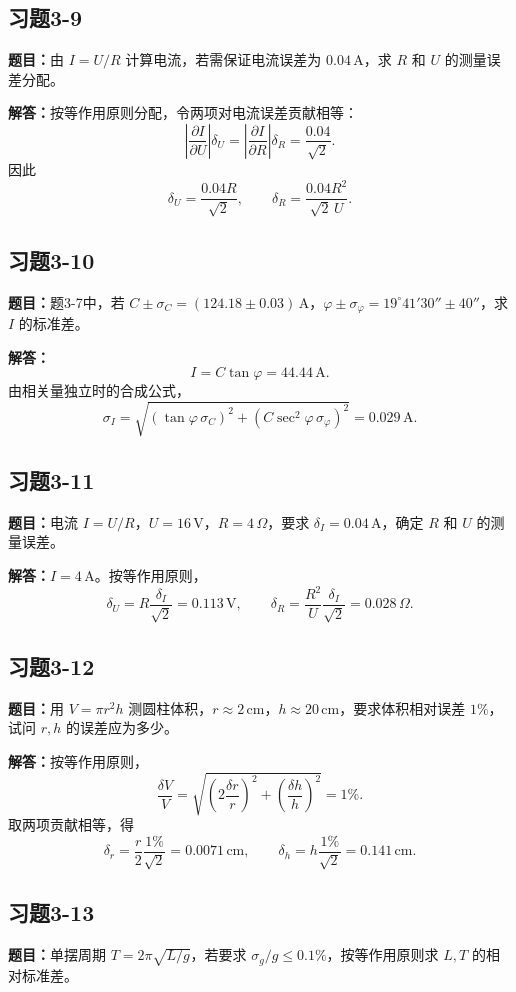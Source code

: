 \documentclass[UTF8,zihao=-4]{ctexart}
\newcommand{\problem}[1]{\subsection*{#1}}
\newcommand{\timu}{\noindent\textbf{题目：}}
\newcommand{\jieda}{\noindent\textbf{解答：}}
\begin{document}
{\problem{习题3-9}
\timu 由 $I=U/R$ 计算电流，若需保证电流误差为 $0.04\,\mathrm{A}$，求 $R$ 和 $U$ 的测量误差分配。

\jieda 按等作用原则分配，令两项对电流误差贡献相等：
\begin{equation*}
    \left|\frac{\partial I}{\partial U}\right|\delta_U=\left|\frac{\partial I}{\partial R}\right|\delta_R=\frac{0.04}{\sqrt2}.
\end{equation*}
因此
\begin{equation*}
    \delta_U=\frac{0.04R}{\sqrt2},\qquad
    \delta_R=\frac{0.04R^2}{\sqrt2\,U}.
\end{equation*}

\problem{习题3-10}
\timu 题3-7中，若 $C\pm\sigma_C=(124.18\pm0.03)\,\mathrm{A}$，$\varphi\pm\sigma_\varphi=19^\circ41'30''\pm40''$，求 $I$ 的标准差。

\jieda
\begin{equation*}
    I=C\tan\varphi=44.44\,\mathrm{A}.
\end{equation*}
由相关量独立时的合成公式，
\begin{equation*}
    \sigma_I=\sqrt{(\tan\varphi\,\sigma_C)^2+(C\sec^2\varphi\,\sigma_\varphi)^2}=0.029\,\mathrm{A}.
\end{equation*}

\problem{习题3-11}
\timu 电流 $I=U/R$，$U=16\,\mathrm{V}$，$R=4\,\Omega$，要求 $\delta_I=0.04\,\mathrm{A}$，确定 $R$ 和 $U$ 的测量误差。

\jieda $I=4\,\mathrm{A}$。按等作用原则，
\begin{equation*}
    \delta_U=R\frac{\delta_I}{\sqrt2}=0.113\,\mathrm{V},\qquad
    \delta_R=\frac{R^2}{U}\frac{\delta_I}{\sqrt2}=0.028\,\Omega.
\end{equation*}

\problem{习题3-12}
\timu 用 $V=\pi r^2h$ 测圆柱体积，$r\approx2\,\mathrm{cm}$，$h\approx20\,\mathrm{cm}$，要求体积相对误差 $1\%$，试问 $r,h$ 的误差应为多少。

\jieda 按等作用原则，
\begin{equation*}
    \frac{\delta V}{V}=\sqrt{\left(2\frac{\delta r}{r}\right)^2+
    \left(\frac{\delta h}{h}\right)^2}=1\%.
\end{equation*}
取两项贡献相等，得
\begin{equation*}
    \delta_r=\frac{r}{2}\frac{1\%}{\sqrt2}=0.0071\,\mathrm{cm},
    \qquad
    \delta_h=h\frac{1\%}{\sqrt2}=0.141\,\mathrm{cm}.
\end{equation*}

\problem{习题3-13}
\timu 单摆周期 $T=2\pi\sqrt{L/g}$，若要求 $\sigma_g/g\le0.1\%$，按等作用原则求 $L,T$ 的相对标准差。

}
\end{document}
